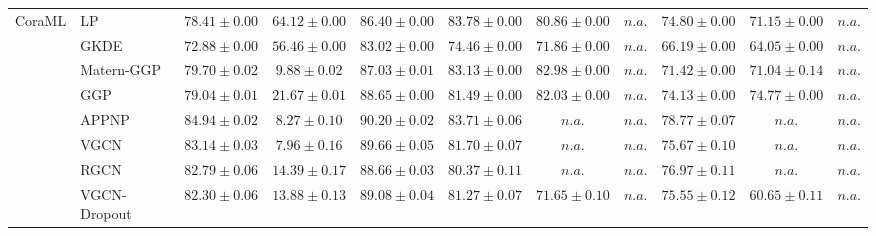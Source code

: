 \begin{table*}[!h]
{\begin{tabular}{ll|cc|cccc|ccc}
        \multirow{14}{*}{CoraML} 
        & LP & ${78.41\scriptscriptstyle \pm 0.00}$ & ${64.12\scriptscriptstyle \pm 0.00}$ & ${86.40\scriptscriptstyle \pm 0.00}$ & ${{83.78}\scriptscriptstyle \pm 0.00}$ & ${80.86\scriptscriptstyle \pm 0.00}$ & $n.a.$ & ${74.80\scriptscriptstyle \pm 0.00}$ & ${71.15\scriptscriptstyle \pm 0.00}$ & $n.a.$\\
        & GKDE & ${72.88\scriptscriptstyle \pm 0.00}$ & ${56.46\scriptscriptstyle \pm 0.00}$ & ${83.02\scriptscriptstyle \pm 0.00}$ & ${74.46\scriptscriptstyle \pm 0.00}$ & ${71.86\scriptscriptstyle \pm 0.00}$ & $n.a.$ & ${66.19\scriptscriptstyle \pm 0.00}$ & ${64.05\scriptscriptstyle \pm 0.00}$ & $n.a.$\\
        & Matern-GGP & ${79.70\scriptscriptstyle \pm 0.02}$ & ${9.88\scriptscriptstyle \pm 0.02}$ & ${87.03\scriptscriptstyle \pm 0.01}$ & ${83.13\scriptscriptstyle \pm 0.00}$ & ${82.98\scriptscriptstyle \pm 0.00}$ & $n.a.$ & ${71.42\scriptscriptstyle \pm 0.00}$ & ${71.04\scriptscriptstyle \pm 0.14}$ & $n.a.$\\
        & GGP & ${79.04\scriptscriptstyle \pm 0.01}$ & ${21.67\scriptscriptstyle \pm 0.01}$ & ${88.65\scriptscriptstyle \pm 0.00}$ & ${81.49\scriptscriptstyle \pm 0.00}$ & ${82.03\scriptscriptstyle \pm 0.00}$ & $n.a.$ & ${74.13\scriptscriptstyle \pm 0.00}$ & ${74.77\scriptscriptstyle \pm 0.00}$ & $n.a.$\\
        & APPNP & ${\mathbf{84.94}\scriptscriptstyle \pm 0.02}$ & ${8.27\scriptscriptstyle \pm 0.10}$ & ${\mathbf{90.20}\scriptscriptstyle \pm 0.02}$ & ${83.71\scriptscriptstyle \pm 0.06}$ & $n.a.$ & $n.a.$ & ${{78.77}\scriptscriptstyle \pm 0.07}$ & $n.a.$ & $n.a.$\\
        & VGCN & ${83.14\scriptscriptstyle \pm 0.03}$ & ${7.96\scriptscriptstyle \pm 0.16}$ & ${89.66\scriptscriptstyle \pm 0.05}$ & ${81.70\scriptscriptstyle \pm 0.07}$ & $n.a.$ & $n.a.$ & ${75.67\scriptscriptstyle \pm 0.10}$ & $n.a.$ & $n.a.$\\
        & RGCN & ${82.79\scriptscriptstyle \pm 0.06}$ & ${14.39\scriptscriptstyle \pm 0.17}$ & ${88.66\scriptscriptstyle \pm 0.03}$ & ${80.37\scriptscriptstyle \pm 0.11}$ & $n.a.$ & $n.a.$ & ${76.97\scriptscriptstyle \pm 0.11}$ & $n.a.$ & $n.a.$\\
        & VGCN-Dropout & ${82.30\scriptscriptstyle \pm 0.06}$ & ${13.88\scriptscriptstyle \pm 0.13}$ & ${89.08\scriptscriptstyle \pm 0.04}$ & ${81.27\scriptscriptstyle \pm 0.07}$ & ${71.65\scriptscriptstyle \pm 0.10}$ & $n.a.$ & ${75.55\scriptscriptstyle \pm 0.12}$ & ${60.65\scriptscriptstyle \pm 0.11}$ & $n.a.$\\

\end{tabular}}
\end{table*}
